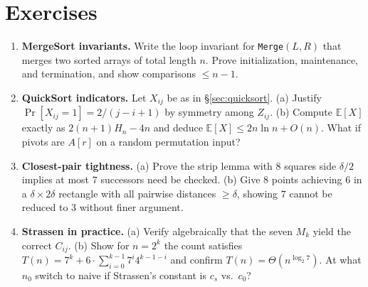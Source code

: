 \section{Exercises}
\label{sec:ch04-exercises}

\begin{enumerate}[label=\textbf{4.\arabic*}]
    \item \textbf{MergeSort invariants.} Write the loop invariant for \texttt{Merge}$(L,R)$ that merges two sorted arrays of total length $n$. Prove initialization, maintenance, and termination, and show comparisons $\le n-1$.
    \item \textbf{QuickSort indicators.} Let $X_{ij}$ be as in \S\ref{sec:quicksort}. (a) Justify $\Pr[X_{ij}=1]=2/(j-i+1)$ by symmetry among $Z_{ij}$. (b) Compute $\mathbb{E}[X]$ exactly as $2(n+1)H_n-4n$ and deduce $\mathbb{E}[X]\le 2n\ln n+O(n)$. What if pivots are $A[r]$ on a random permutation input?
    \item \textbf{Closest-pair tightness.} (a) Prove the strip lemma with $8$ squares side $\delta/2$ implies at most $7$ successors need be checked. (b) Give $8$ points achieving $6$ in a $\delta\times2\delta$ rectangle with all pairwise distances $\ge\delta$, showing $7$ cannot be reduced to $3$ without finer argument.
    \item \textbf{Strassen in practice.} (a) Verify algebraically that the seven $M_k$ yield the correct $C_{ij}$. (b) Show for $n=2^k$ the count satisfies $T(n)=7^k+6\cdot\sum_{i=0}^{k-1}7^i4^{k-1-i}$ and confirm $T(n)=\Theta(n^{\log_2 7})$. At what $n_0$ switch to naive if Strassen's constant is $c_s$ vs.\ $c_0$?
\end{enumerate}
